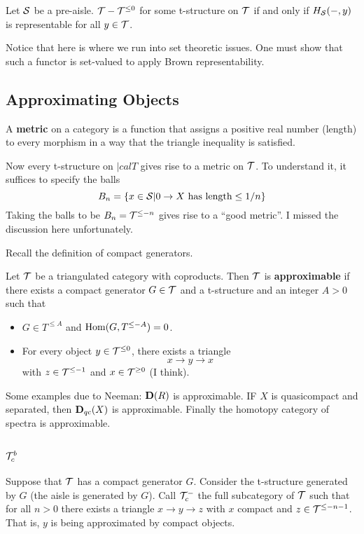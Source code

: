 \documentclass[12pt]{article}
\begin{document}
\begin{prop}[Neeman]
	Let $\mathcal{S}$ be a pre-aisle. $\mathcal{T}-\mathcal{T}^{\le 0}$ for some t-structure on $\mathcal{T}$ if and only if $H_{\mathcal{S}}(-,y)$ is representable for all $y\in\mathcal{T}$.
\end{prop}
\begin{rmk}
	Notice that here is where we run into set theoretic issues. One must show that such a functor is set-valued to apply Brown representability.
\end{rmk}

\subsection{Approximating Objects}
\begin{defn}
	A \textbf{metric} on a category is a function that assigns a positive real number (length) to every morphism in a way that the triangle inequality is satisfied.
\end{defn}

Now every t-structure on $|calT$ gives rise to a metric on $\mathcal{T}$. To understand it, it suffices to specify the balls 
\[B_n=\{x\in\mathcal{S}|0\to X\text{ has length}\le 1/n\}\]
Taking the balls to be $B_n=\mathcal{T}^{\le -n}$ gives rise to a ``good metric''. I missed the discussion here unfortunately.

Recall the definition of compact generators.

\begin{defn}
	Let $\mathcal{T}$ be a triangulated category with coproducts. Then $\mathcal{T}$ is \textbf{approximable} if there exists a compact 
	generator $G\in\mathcal{T}$ and a t-structure and an integer $A>0$ such that 
	\begin{itemize}
		\item $G\in T^{\le A}$ and $\operatorname{Hom}(G,T^{\le -A})=0$.
		\item For every object $y\in\mathcal{T}^{\le 0}$, there exists a triangle
		\[x\to y\to x\]
		with $z\in\mathcal{T}^{\le -1}$ and $x\in\mathcal{T}^{\ge 0}$ (I think).
	\end{itemize}
\end{defn}

Some examples due to Neeman: $\mathbf{D}(R)$ is approximable. IF $X$ is quasicompact and separated, then $\mathbf{D}_{qc}(X)$ is approximable. Finally the homotopy category of spectra is approximable.

\subsection{\texorpdfstring{$\mathcal{T}^b_c$}{Tcb}}
Suppose that $\mathcal{T}$ has a compact generator $G$. Consider the t-structure generated by $G$ (the aisle is generated by $G$). Call $\mathcal{T}_c^-$
the full subcategory of $\mathcal{T}$ such that for all $n>0$ there exists a triangle $x\to y\to z$ with $x$ compact and $z\in\mathcal{T}^{\le -n-1}$. That is, $y$ is being approximated by compact objects.
\end{document}
